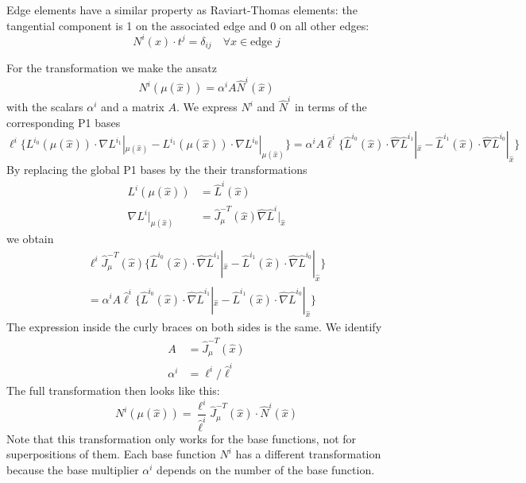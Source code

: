 \documentclass[a4paper,11pt]{article}
\begin{document}
Edge elements have a similar property as Raviart-Thomas elements: the
tangential component is 1 on the associated edge and 0 on all other edges:
\begin{equation}
  N^i(x)\cdot t^j=\delta_{ij}\quad\forall x\in\text{edge $j$}
\end{equation}

For the transformation we make the ansatz
\begin{equation}
  N^i(\mu(\hat x)) = \alpha^iA\hat N^i(\hat x)
\end{equation}
with the scalars $\alpha^i$ and a matrix $A$.  We express $N^i$ and $\hat N^i$
in terms of the corresponding P1 bases
\begin{equation}
  \ell^i\{L^{i_0}(\mu(\hat x)) \cdot \nabla L^{i_1}|_{\mu(\hat x)}
          - L^{i_1}(\mu(\hat x)) \cdot \nabla L^{i_0}|_{\mu(\hat x)}\}
  = \alpha^iA\hat\ell^i\{
          \hat L^{i_0}(\hat x) \cdot \hat\nabla\hat L^{i_1}|_{\hat x}
        - \hat L^{i_1}(\hat x) \cdot \hat\nabla\hat L^{i_0}|_{\hat x}\}
\end{equation}
By replacing the global P1 bases by the their transformations
\begin{align}
  L^i(\mu(\hat x)) &= \hat L^i(\hat x) \\
  \nabla L^i|_{\mu(\hat x)} &= \hat J_\mu^{-T}(\hat x) \hat\nabla\hat L^i|_{\hat x}
\end{align}
we obtain
\begin{multline}
  \ell^i\hat J_\mu^{-T}(\hat x)\{
          \hat L^{i_0}(\hat x) \cdot \hat\nabla\hat L^{i_1}|_{\hat x}
        - \hat L^{i_1}(\hat x) \cdot \hat\nabla\hat L^{i_0}|_{\hat x}\} \\
  = \alpha^iA\hat\ell^i\{
          \hat L^{i_0}(\hat x) \cdot \hat\nabla\hat L^{i_1}|_{\hat x}
        - \hat L^{i_1}(\hat x) \cdot \hat\nabla\hat L^{i_0}|_{\hat x}\}
\end{multline}
The expression inside the curly braces on both sides is the same.  We identify
\begin{align}
  A &= \hat J_\mu^{-T}(\hat x) \\
  \alpha^i &= \ell^i/\hat\ell^i
\end{align}
The full transformation then looks like this:
\begin{equation}
  N^i(\mu(\hat x)) = \frac{\ell^i}{\hat\ell^i}
    \hat J_\mu^{-T}(\hat x) \cdot \hat N^i(\hat x)
\end{equation}
Note that this transformation only works for the base functions, not for
superpositions of them.  Each base function $N^i$ has a different
transformation because the base multiplier $\alpha^i$ depends on the number of
the base function.
\end{document}
